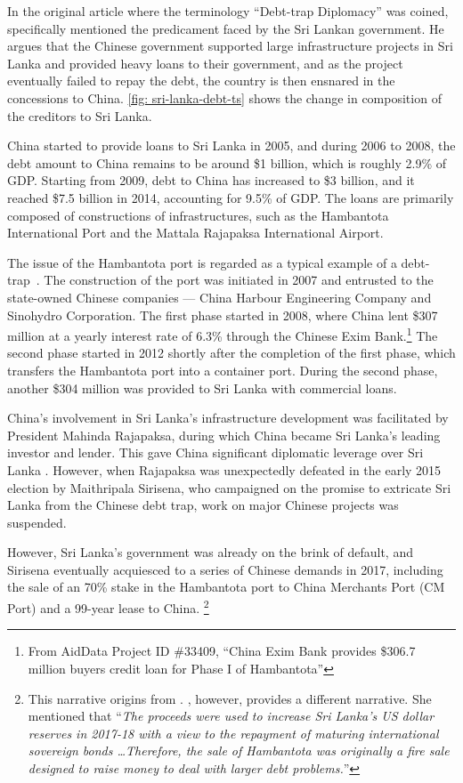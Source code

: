 In the original article where the terminology ``Debt-trap Diplomacy'' was coined, \citet{Chellaney_2017} specifically mentioned the predicament faced by the Sri Lankan government. He argues that the Chinese government supported large infrastructure projects in Sri Lanka and provided heavy loans to their government, and as the project eventually failed to repay the debt, the country is then ensnared in the concessions to China. \autoref{fig: sri-lanka-debt-ts} shows the change in composition of the creditors to Sri Lanka.

China started to provide loans to Sri Lanka in 2005, and during 2006 to 2008, the debt amount to China remains to be around \$1 billion, which is roughly 2.9\% of GDP. Starting from 2009, debt to China has increased to \$3 billion, and it reached \$7.5 billion in 2014, accounting for 9.5\% of GDP. The loans are primarily composed of constructions of infrastructures, such as the Hambantota International Port and the Mattala Rajapaksa International Airport.

The issue of the Hambantota port is regarded as a typical example of a debt-trap~\citep*{Moramudali_2020}.
The construction of the port was initiated in 2007 and entrusted to the state-owned Chinese companies --- China Harbour Engineering Company and Sinohydro Corporation.
The first phase started in 2008, where China lent \$307 million at a yearly interest rate of 6.3\% through the Chinese Exim Bank.\footnote{
    From AidData Project ID \#33409, ``China Exim Bank provides \$306.7 million buyers credit loan for Phase I of Hambantota''}
The second phase started in 2012 shortly after the completion of the first phase, which transfers the Hambantota port into a container port\cite{}. During the second phase, another \$304 million was provided to Sri Lanka with commercial loans.


China's involvement in Sri Lanka's infrastructure development was facilitated by President Mahinda Rajapaksa, during which China became Sri Lanka's leading investor and lender. This gave China significant diplomatic leverage over Sri Lanka \citep*{Chellaney_2017}.
However, when Rajapaksa was unexpectedly defeated in the early 2015 election by Maithripala Sirisena, who campaigned on the promise to extricate Sri Lanka from the Chinese debt trap, work on major Chinese projects was suspended.

However, Sri Lanka's government was already on the brink of default, and Sirisena eventually acquiesced to a series of Chinese demands in 2017, including the sale of an 70\% stake in the Hambantota port to China Merchants Port (CM Port) and a 99-year lease to China.
\footnote{
    This narrative origins from \citet*{Chellaney_2017}. \citet*{Brautigam-meme-2020}, however, provides a different narrative. She mentioned that ``\emph{The proceeds were used to increase Sri Lanka's
    US dollar reserves in 2017-18 with a view to the repayment of maturing international sovereign bonds \dots Therefore, the sale of Hambantota was originally a fire sale designed to raise money to deal
    with larger debt problems.}''
}

